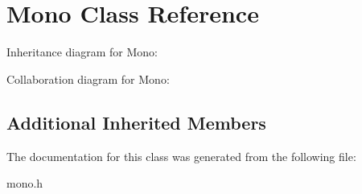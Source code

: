 \hypertarget{classMono}{}\section{Mono Class Reference}
\label{classMono}


Inheritance diagram for Mono\+:


Collaboration diagram for Mono\+:
\subsection*{Additional Inherited Members}


The documentation for this class was generated from the following file\+:\begin{DoxyCompactItemize}
\item 
mono.\+h\end{DoxyCompactItemize}
